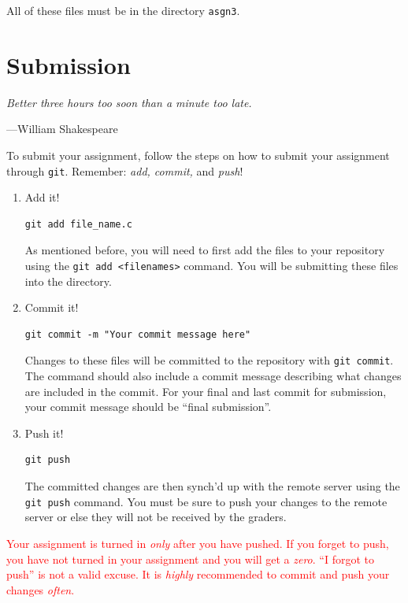 \documentclass[11pt]{article}
\newcommand\asgn[1]{asgn#1}
\begin{document}
All of these files must be in the directory \texttt{\asgn{3}}.

\section{Submission}
\textwidth
\epigraph{\emph{Better three
hours too soon than a minute too late.}}{---William Shakespeare}

To submit your assignment, follow the steps on how
to submit your assignment through \texttt{git}. Remember: \emph{add, commit,}
and \emph{push}!

\begin{enumerate}
\item Add it!
\begin{lstlisting}
git add file_name.c
\end{lstlisting}
As mentioned before, you will need to first add the files to
your repository using the \texttt{git add <filenames>} command. You
will be submitting these files into the \texttt{\asgn}
directory.

\item Commit it!
\begin{lstlisting}
git commit -m "Your commit message here"
\end{lstlisting}
Changes to these files will be committed to the repository with
\texttt{git commit}. The command should also include a commit message
describing what changes are included in the commit. For your final and last commit for submission, your commit message should be ``final submission''.

\item Push it!
\begin{lstlisting}
git push
\end{lstlisting}
The committed changes are then synch'd up with the remote server
using the \texttt{git push} command. You must be sure to push your
changes to the remote server or else they will not be received by
the graders.

\end{enumerate}

\textcolor{red}{Your assignment is turned in \emph{only} after you have pushed.
If you forget to push, you have not turned in your assignment and you will get a
\emph{zero}. ``I forgot to push'' is not a valid excuse. It is \emph{highly}
recommended to commit and push your changes \emph{often}.}

\end{document}
